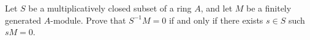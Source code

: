 \begin{exercise}
Let \(S\) be a multiplicatively closed subset of a ring \(A\), and let \(M\) be a finitely generated \(A\)-module.
Prove that \(S^{-1} M = 0\) if and only if there exists \(s \in S\) such \(s M = 0\).
\end{exercise}